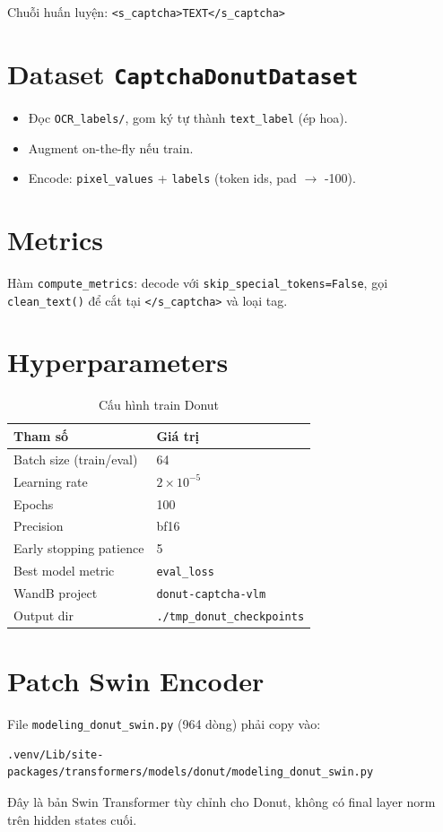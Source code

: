 \documentclass[a4paper,12pt]{report}
\begin{document}
Chuỗi huấn luyện: \texttt{<s\_captcha>TEXT</s\_captcha>}

\section{Dataset \texttt{CaptchaDonutDataset}}
\begin{itemize}[leftmargin=*]
  \item Đọc \texttt{OCR\_labels/}, gom ký tự thành \texttt{text\_label} (ép hoa).
  \item Augment on-the-fly nếu train.
  \item Encode: \texttt{pixel\_values} + \texttt{labels} (token ids, pad $\rightarrow$ -100).
\end{itemize}

\section{Metrics}
Hàm \texttt{compute\_metrics}: decode với \texttt{skip\_special\_tokens=False}, gọi \texttt{clean\_text()} để cắt tại \texttt{</s\_captcha>} và loại tag.

\section{Hyperparameters}
\begin{table}[H]
  \centering
  \caption{Cấu hình train Donut}
  \begin{tabular}{ll}
    \toprule
    \textbf{Tham số} & \textbf{Giá trị} \\
    \midrule
    Batch size (train/eval) & 64 \\
    Learning rate & $2 \times 10^{-5}$ \\
    Epochs & 100 \\
    Precision & bf16 \\
    Early stopping patience & 5 \\
    Best model metric & \texttt{eval\_loss} \\
    WandB project & \texttt{donut-captcha-vlm} \\
    Output dir & \texttt{./tmp\_donut\_checkpoints} \\
    \bottomrule
  \end{tabular}
\end{table}

\section{Patch Swin Encoder}
File \texttt{modeling\_donut\_swin.py} (964 dòng) phải copy vào:
\begin{verbatim}
.venv/Lib/site-packages/transformers/models/donut/modeling_donut_swin.py
\end{verbatim}
Đây là bản Swin Transformer tùy chỉnh cho Donut, không có final layer norm trên hidden states cuối.
\end{document}
